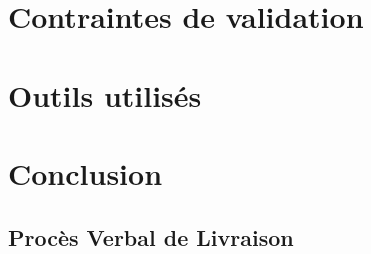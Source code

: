 \part{Contraintes de validation }
\setcounter{section}{0}

\part{Outils utilisés}
\setcounter{section}{0}

\part{Conclusion}
\setcounter{section}{0}


\appendix
\chapter{Procès Verbal de Livraison}




